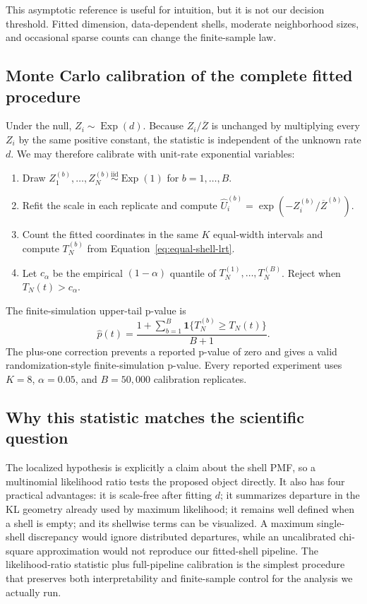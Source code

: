 \documentclass[11pt]{article}
\begin{document}
This asymptotic reference is useful for intuition, but it is not our decision
threshold. Fitted dimension, data-dependent shells, moderate neighborhood
sizes, and occasional sparse counts can change the finite-sample law.

\subsection{Monte Carlo calibration of the complete fitted procedure}

Under the null, $Z_i\sim\operatorname{Exp}(d)$. Because
$Z_i/\overline Z$ is unchanged by multiplying every $Z_i$ by the same positive
constant, the statistic is independent of the unknown rate $d$. We may
therefore calibrate with unit-rate exponential variables:
\begin{enumerate}
  \item Draw $Z_1^{(b)},\ldots,Z_N^{(b)}\stackrel{\mathrm{iid}}{\sim}
  \operatorname{Exp}(1)$ for $b=1,\ldots,B$.
  \item Refit the scale in each replicate and compute
  $\widehat U_i^{(b)}=\exp(-Z_i^{(b)}/\overline Z^{(b)})$.
  \item Count the fitted coordinates in the same $K$ equal-width intervals and
  compute $T_N^{(b)}$ from Equation~\eqref{eq:equal-shell-lrt}.
  \item Let $c_\alpha$ be the empirical $(1-\alpha)$ quantile of
  $T_N^{(1)},\ldots,T_N^{(B)}$. Reject when $T_N(t)>c_\alpha$.
\end{enumerate}
The finite-simulation upper-tail p-value is
\begin{equation}
  \widehat p(t)=
  \frac{1+\sum_{b=1}^{B}\mathbf 1\{T_N^{(b)}\ge T_N(t)\}}{B+1}.
  \label{eq:mc-pvalue}
\end{equation}
The plus-one correction prevents a reported p-value of zero and gives a valid
randomization-style finite-simulation p-value. Every reported experiment uses
$K=8$, $\alpha=0.05$, and $B=50{,}000$ calibration replicates.

\subsection{Why this statistic matches the scientific question}

The localized hypothesis is explicitly a claim about the shell PMF, so a
multinomial likelihood ratio tests the proposed object directly. It also has
four practical advantages: it is scale-free after fitting $d$; it summarizes
departure in the KL geometry already used by maximum likelihood; it remains
well defined when a shell is empty; and its shellwise terms can be visualized.
A maximum single-shell discrepancy would ignore distributed departures, while
an uncalibrated chi-square approximation would not reproduce our fitted-shell
pipeline. The likelihood-ratio statistic plus full-pipeline calibration is the
simplest procedure that preserves both interpretability and finite-sample
control for the analysis we actually run.
\end{document}
